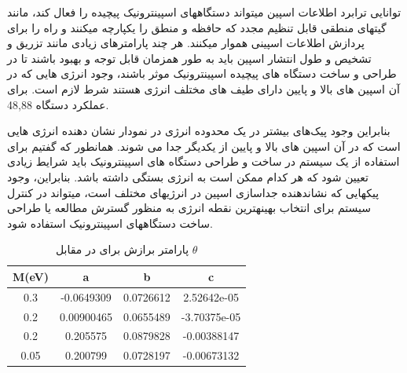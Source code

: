 توانایی ترابرد اطلاعات اسپین میتواند دستگاههای اسپینترونیک پیچیده را فعال کند، مانند گیتهای منطقی قابل تنظیم مجدد که حافظه و منطق را یکپارچه میکنند و راه را برای پردازش اطلاعات اسپینی هموار میکنند. هر چند پارامترهای زیادی مانند تزریق و تشخیص و طول انتشار اسپین باید به طور همزمان قابل توجه و بهبود باشند تا در طراحی و ساخت دستگاه های پیچیده اسپینترونیک موثر باشند، وجود انرژی هایی که در آن اسپین های بالا و پایین دارای طیف های مختلف انرژی هستند شرط لازم است. برای عملکرد دستگاه 48,88. 

بنابراین وجود پیک‌های بیشتر در یک محدوده انرژی در نمودار  نشان دهنده انرژی هایی است که در آن اسپین های بالا و پایین از یکدیگر جدا می شوند. همانطور که گفتیم برای استفاده از یک سیستم در ساخت و طراحی دستگاه های اسپینترونیک باید شرایط زیادی تعیین شود که هر کدام ممکن است به انرژی بستگی داشته باشد. بنابراین، وجود پیکهایی که نشاندهنده جداسازی اسپین در انرژیهای مختلف است، میتواند در کنترل سیستم برای انتخاب بهینهترین نقطه انرژی به منظور گسترش مطالعه یا طراحی ساخت دستگاههای اسپینترونیک استفاده شود.

\begin{table}[t]
  \caption{ پارامتر برازش برای  در مقابل $\theta$}
  \begin{latin}
    \centering
      \label{tbl:fitting}
      \begin{tabular}{cccc}
        \toprule
        M(eV) & a & b & c \\
        \midrule
        0.3 & -0.0649309 & 0.0726612 & 2.52642e-05 \\
        0.2 & 0.00900465 & 0.0655489 & -3.70375e-05 \\
        0.2 & 0.205575 & 0.0879828 & -0.00388147 \\
        0.05 & 0.200799 & 0.0728197 & -0.00673132 \\
        \bottomrule
      \end{tabular}
    \end{latin}
  \end{table}
